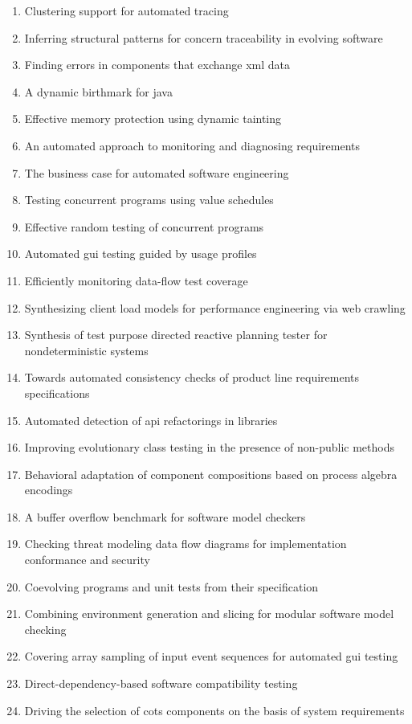 \begin{enumerate}[itemsep=-1ex]
  \item Clustering support for automated tracing
  \item Inferring structural patterns for concern traceability in evolving software
  \item Finding errors in components that exchange xml data
  \item A dynamic birthmark for java
  \item Effective memory protection using dynamic tainting
  \item An automated approach to monitoring and diagnosing requirements
  \item The business case for automated software engineering
  \item Testing concurrent programs using value schedules
  \item Effective random testing of concurrent programs
  \item Automated gui testing guided by usage profiles
  \item Efficiently monitoring data-flow test coverage
  \item Synthesizing client load models for performance engineering via web crawling
  \item Synthesis of test purpose directed reactive planning tester for nondeterministic systems
  \item Towards automated consistency checks of product line requirements specifications
  \item Automated detection of api refactorings in libraries
  \item Improving evolutionary class testing in the presence of non-public methods
  \item Behavioral adaptation of component compositions based on process algebra encodings
  \item A buffer overflow benchmark for software model checkers
  \item Checking threat modeling data flow diagrams for implementation conformance and security
  \item Coevolving programs and unit tests from their specification
  \item Combining environment generation and slicing for modular software model checking
  \item Covering array sampling of input event sequences for automated gui testing
  \item Direct-dependency-based software compatibility testing
  \item Driving the selection of cots components on the basis of system requirements

\end{enumerate}
